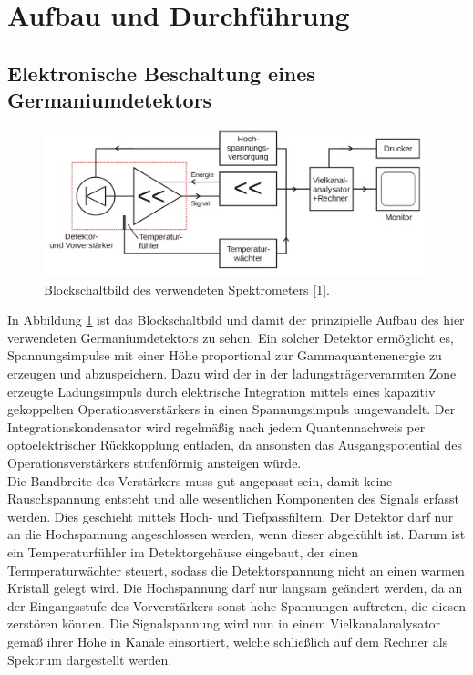 \section{Aufbau und Durchführung}
\label{sec:Durchführung}

\subsection{Elektronische Beschaltung eines Germaniumdetektors}

\begin{figure}
    \centering
    \includegraphics[scale=0.3]{content/aufbau.png}
    \caption{Blockschaltbild des verwendeten Spektrometers [1].}
    \label{fig:aufbau}
\end{figure}


In Abbildung \ref{fig:aufbau} ist das Blockschaltbild und damit der prinzipielle Aufbau des hier verwendeten Germaniumdetektors zu sehen. Ein solcher Detektor ermöglicht es, 
Spannungsimpulse mit einer Höhe proportional zur Gammaquantenenergie zu erzeugen und abzuspeichern. Dazu wird der in der ladungsträgerverarmten Zone erzeugte 
Ladungsimpuls durch elektrische Integration mittels eines kapazitiv gekoppelten Operationsverstärkers in einen Spannungsimpuls umgewandelt. Der Integrationskondensator
wird regelmäßig nach jedem Quantennachweis per optoelektrischer Rückkopplung entladen, da ansonsten das Ausgangspotential des Operationsverstärkers stufenförmig 
ansteigen würde. \\
Die Bandbreite des Verstärkers muss gut angepasst sein, damit keine Rauschspannung entsteht und alle wesentlichen Komponenten des Signals erfasst werden. Dies 
geschieht mittels Hoch- und Tiefpassfiltern. Der Detektor darf nur an die Hochspannung angeschlossen werden, wenn dieser abgekühlt ist. Darum ist ein Temperaturfühler
im Detektorgehäuse eingebaut, der einen Termperaturwächter steuert, sodass die Detektorspannung nicht an einen warmen Kristall gelegt wird. Die Hochspannung 
darf nur langsam geändert werden, da an der Eingangsstufe des Vorverstärkers sonst hohe Spannungen auftreten, die diesen zerstören können. Die Signalspannung wird nun
in einem Vielkanalanalysator gemäß ihrer Höhe in Kanäle einsortiert, welche schließlich auf dem Rechner als Spektrum dargestellt werden. 

